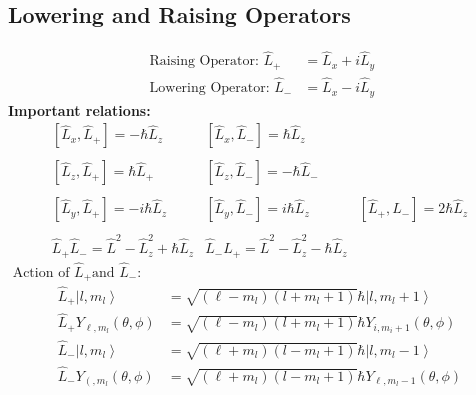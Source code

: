 \subsection{Lowering and Raising Operators}
\begin{align*}
	\text { Raising Operator: }  \hat{L}_{+}&=\hat{L}_{x}+i \hat{L}_{y}\\
\text { Lowering Operator: }  \hat{L}_{-}&=\hat{L}_{x}-i \hat{L}_{y}
\end{align*}
\textbf{Important relations:}
$$
\begin{array}{lll}
{\left[\hat{L}_{x}, \hat{L}_{+}\right]=-\hbar \hat{L}_{z}}&{\left[\hat{L}_{x}, \hat{L}_{-}\right]=\hbar \hat{L}_{z}}\\\\
{\left[\hat{L}_{z}, \hat{L}_{+}\right]=\hbar \hat{L}_{+}} & {\left[\hat{L}_{z}, \hat{L}_{-}\right]=-\hbar \hat{L}_{-}}  \\\\
{\left[\hat{L}_{y}, \hat{L}_{+}\right]=-i \hbar \hat{L}_{z}} & {\left[\hat{L}_{y}, \hat{L}_{-}\right]=i \hbar \hat{L}_{z}} & {\left[\hat{L}_{+}, \hat{L}_{-}\right]=2 \hbar \hat{L}_{z}} \\\\
\hat{L}_{+} \hat{L}_{-}=\hat{L}^{2}-\hat{L}_{z}^{2}+\hbar \hat{L}_{z} & \hat{L}_{-} \hat{L}_{+}=\hat{L}^{2}-\hat{L}_{z}^{2}-\hbar \hat{L}_{z}
\end{array}
$$
$\text { Action of } \hat{L}_{+} \text {and } \hat{L}_{-}:$
\begin{align*}	
\hat{L}_{+}\left|l, m_{l}\right\rangle&=\sqrt{\left(\ell-m_{l}\right)\left(l+m_{l}+1\right)} \hbar\left|l, m_{l}+1\right\rangle \\
\hat{L}_{+} Y_{\ell, m_{l}}(\theta, \phi)&=\sqrt{\left(\ell-m_{l}\right)\left(l+m_{l}+1\right)} \hbar Y_{i, m_{i}+1}(\theta, \phi)\\
\hat{L}_{-}\left|l, m_{l}\right\rangle&=\sqrt{\left(\ell+m_{l}\right)\left(l-m_{l}+1\right)} \hbar\left|l, m_{l}-1\right\rangle \\
\hat{L}_{-} Y_{\left(, m_{l}\right.}(\theta, \phi)&=\sqrt{\left(\ell+m_{l}\right)\left(l-m_{l}+1\right)} \hbar Y_{\ell, m_{l}-1}(\theta, \phi)
\end{align*}
